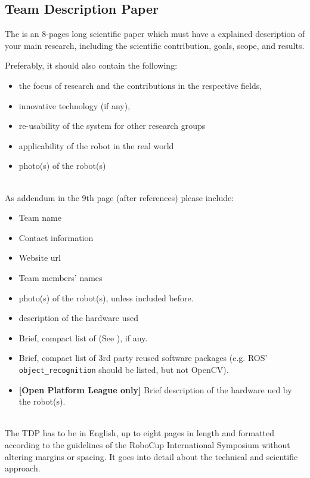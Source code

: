 \subsection{Team Description Paper}
\label{rule:website_tdp}
The  is an 8-pages long scientific paper which must have a explained description of your main research, including the scientific contribution, goals, scope, and results.

Preferably, it should also contain the following:
\begin{itemize}
	\item the focus of research and the contributions in the respective fields, 
	\item innovative technology (if any), 
	\item re-usability of the system for other research groups
	\item applicability of the robot in the real world
	\item photo(s) of the robot(s)
\end{itemize}

~\\\noindent As addendum in the 9th page (after references) please include:
\begin{itemize}
	\item Team name
	\item Contact information
	\item Website url
	\item Team members' names
	\item photo(s) of the robot(s), unless included before.
	\item description of the hardware used 
	\item Brief, compact list of  (See ), if any.
	\item Brief, compact list of 3rd party reused software packages (e.g. ROS' \texttt{object\_recognition} should be listed, but not OpenCV).
	\item \textbf{[Open Platform League only]} Brief description of the hardware ued by the robot(s).
\end{itemize}

~\\\noindent The TDP has to be in English, up to eight pages in length and formatted according to the guidelines of the RoboCup International Symposium without altering margins or spacing. It goes into detail about the technical and scientific approach.

